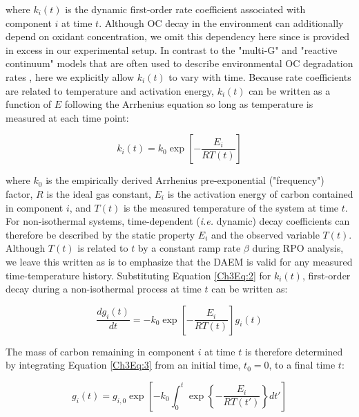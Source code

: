 where $k_{i}(t)$ is the dynamic first-order rate coefficient associated with component $i$ at time $t$. Although OC decay in the environment can additionally depend on oxidant concentration, we omit this dependency here since  is provided in excess in our experimental setup. In contrast to the "multi-G" and "reactive continuum" models that are often used to describe environmental OC degradation rates \citep{Westrich:1984uj,Boudreau:1991wf,Forney:2012dr,Forney:2012hz}, here we explicitly allow $k_{i}(t)$ to vary with time. Because rate coefficients are related to temperature and activation energy, $k_{i}(t)$ can be written as a function of $E$ following the Arrhenius equation so long as temperature is measured at each time point:

\begin{equation}\label{Ch3Eq:2}
	k_{i}(t) = k_{0} \exp \left[ - \frac{E_{i}}{RT(t)} \right]
\end{equation}

where $k_0$ is the empirically derived Arrhenius pre-exponential ("frequency") factor, $R$ is the ideal gas constant, $E_{i}$ is the activation energy of carbon contained in component $i$, and $T(t)$ is the measured temperature of the system at time $t$. For non-isothermal systems, time-dependent (\textit{i.e.} dynamic) decay coefficients can therefore be described by the static property $E_{i}$ and the observed variable $T(t)$. Although $T(t)$ is related to $t$ by a constant ramp rate $\beta$ during RPO analysis, we leave this written as is to emphasize that the DAEM is valid for any measured time-temperature history. Substituting Equation \ref{Ch3Eq:2} for $k_{i}(t)$, first-order decay during a non-isothermal process at time $t$ can be written as:

\begin{equation}\label{Ch3Eq:3}
	\frac{dg_{i}(t)}{dt} = - k_{0} \exp \left[ - \frac{E_{i}}{RT(t)} \right] g_{i}(t)
\end{equation}

The mass of carbon remaining in component $i$ at time $t$ is therefore determined by integrating Equation \ref{Ch3Eq:3} from an initial time, $t_{0} = 0$, to a final time $t$:

\begin{equation}\label{Ch3Eq:4}
	g_{i}(t) = g_{i,0} \exp \left[ - k_{0} \int_{0}^{t} \exp \left\{ - \frac{E_{i}}{RT(t')} \right\} dt' \right]
\end{equation}

